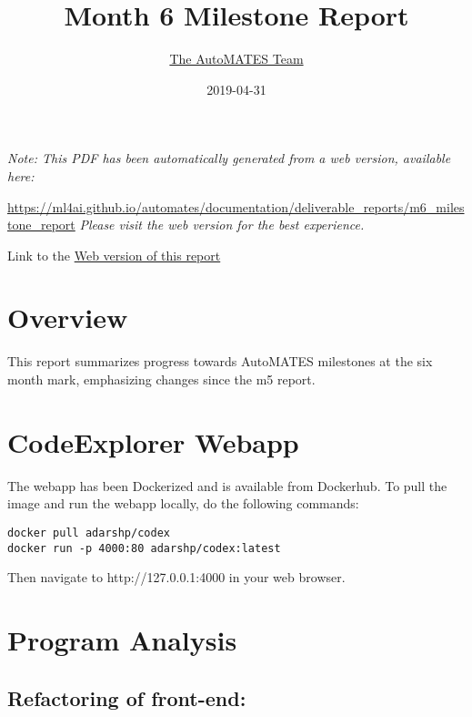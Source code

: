 \documentclass[article, 12pt, oneside]{memoir}
\title{Month 6 Milestone Report}
\author{\href{https://ml4ai.github.io/automates/team/}{The AutoMATES Team}}
\date{2019-04-31}
\begin{document}
\maketitle
\tableofcontents*

\bigskip
\bigskip

\noindent \emph{Note: This PDF has been automatically generated from a web
  version, available here:}

  {
  \small
\noindent
\url{https://ml4ai.github.io/automates/documentation/deliverable_reports/m6_milestone_report}
}
\emph{Please visit the web version for the best experience.}

Link to the \href{https://ml4ai.github.io/automates/documentation/deliverable_reports/m6_milestone_report/}{Web version of this report}

\hypertarget{overview}{%
\section{Overview}\label{overview}}

This report summarizes progress towards AutoMATES milestones at the six
month mark, emphasizing changes since the m5 report.

\hypertarget{codeexplorer-webapp}{%
\section{CodeExplorer Webapp}\label{codeexplorer-webapp}}

The webapp has been Dockerized and is available from Dockerhub. To pull
the image and run the webapp locally, do the following commands:

\begin{verbatim}
docker pull adarshp/codex
docker run -p 4000:80 adarshp/codex:latest
\end{verbatim}

Then navigate to http://127.0.0.1:4000 in your web browser.

\hypertarget{program-analysis}{%
\section{Program Analysis}\label{program-analysis}}

\hypertarget{refactoring-of-front-end}{%
\subsection{Refactoring of front-end:}\label{refactoring-of-front-end}}
\end{document}
